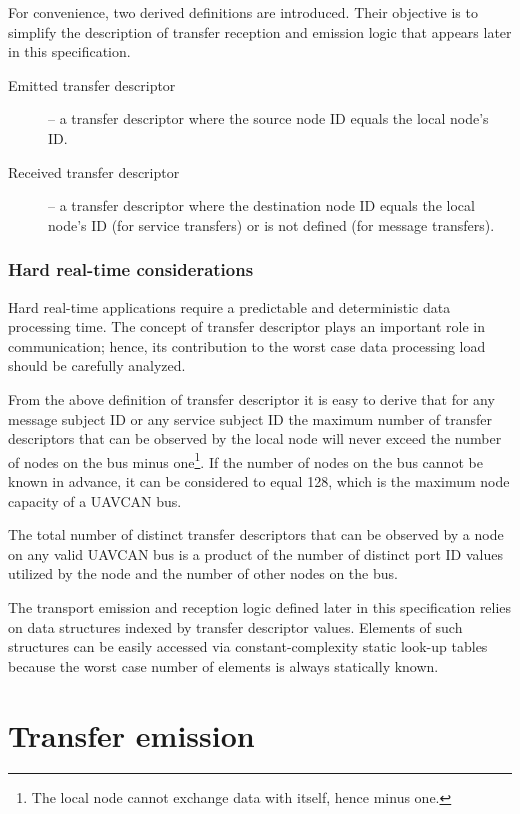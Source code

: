 For convenience, two derived definitions are introduced.
Their objective is to simplify the description of transfer reception and emission logic that appears later in this
specification.
\begin{description}
    \item[Emitted transfer descriptor] -- a transfer descriptor where the source node ID equals the local node's ID.
    \item[Received transfer descriptor] -- a transfer descriptor where the destination node ID equals
    the local node's ID (for service transfers) or is not defined (for message transfers).
\end{description}

\subsubsection{Hard real-time considerations}

Hard real-time applications require a predictable and deterministic data processing time.
The concept of transfer descriptor plays an important role in communication;
hence, its contribution to the worst case data processing load should be carefully analyzed.

\begin{remark}
    From the above definition of transfer descriptor it is easy to derive that for any
    message subject ID or any service subject ID the maximum number of transfer descriptors
    that can be observed by the local node will never exceed the number of nodes on the bus minus
    one\footnote{The local node cannot exchange data with itself, hence minus one.}.
    If the number of nodes on the bus cannot be known in advance, it can be considered to equal 128,
    which is the maximum node capacity of a UAVCAN bus.

    The total number of distinct transfer descriptors that can be observed by a node on any valid UAVCAN bus
    is a product of the number of distinct port ID values utilized by the node and the number of other nodes on the bus.

    The transport emission and reception logic defined later in this specification relies on data structures
    indexed by transfer descriptor values.
    Elements of such structures can be easily accessed via constant-complexity static look-up tables
    because the worst case number of elements is always statically known.
\end{remark}

\section{Transfer emission}

